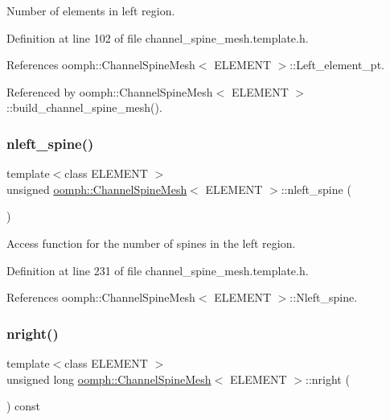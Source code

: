 Number of elements in left region. 



Definition at line 102 of file channel\+\_\+spine\+\_\+mesh.\+template.\+h.



References oomph\+::\+Channel\+Spine\+Mesh$<$ E\+L\+E\+M\+E\+N\+T $>$\+::\+Left\+\_\+element\+\_\+pt.



Referenced by oomph\+::\+Channel\+Spine\+Mesh$<$ E\+L\+E\+M\+E\+N\+T $>$\+::build\+\_\+channel\+\_\+spine\+\_\+mesh().

\mbox{\label{classoomph_1_1ChannelSpineMesh_af5ae7133c9939b90779f0809143676bd}} 
\subsubsection{\texorpdfstring{nleft\+\_\+spine()}{nleft\_spine()}}
{\footnotesize\ttfamily template$<$class E\+L\+E\+M\+E\+NT $>$ \\
unsigned \hyperlink{classoomph_1_1ChannelSpineMesh}{oomph\+::\+Channel\+Spine\+Mesh}$<$ E\+L\+E\+M\+E\+NT $>$\+::nleft\+\_\+spine (\begin{DoxyParamCaption}{ }\end{DoxyParamCaption})\hspace{0.3cm}{\ttfamily [inline]}}



Access function for the number of spines in the left region. 



Definition at line 231 of file channel\+\_\+spine\+\_\+mesh.\+template.\+h.



References oomph\+::\+Channel\+Spine\+Mesh$<$ E\+L\+E\+M\+E\+N\+T $>$\+::\+Nleft\+\_\+spine.

\mbox{\label{classoomph_1_1ChannelSpineMesh_a559352375de869e889191d0e6c133031}} 
\subsubsection{\texorpdfstring{nright()}{nright()}}
{\footnotesize\ttfamily template$<$class E\+L\+E\+M\+E\+NT $>$ \\
unsigned long \hyperlink{classoomph_1_1ChannelSpineMesh}{oomph\+::\+Channel\+Spine\+Mesh}$<$ E\+L\+E\+M\+E\+NT $>$\+::nright (\begin{DoxyParamCaption}{ }\end{DoxyParamCaption}) const\hspace{0.3cm}{\ttfamily [inline]}}




